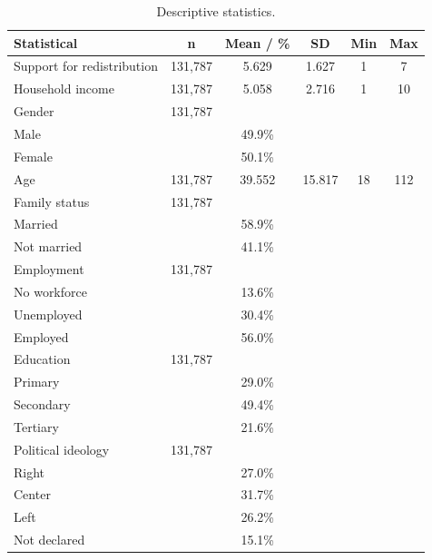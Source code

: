 \documentclass[utf8]{frontiersSCNS} %
\begin{document}
\begin{table}
\small\sf\centering
\caption{Descriptive statistics.}
\label{tab:descreptive}
\begin{tabular}{lccccc}
\toprule
Statistical & n & Mean / \% & SD & Min & Max \\
\midrule
Support for redistribution & 131,787 & 5.629 & 1.627 & 1 & 7 \\
Household income & 131,787 & 5.058 & 2.716 & 1 & 10 \\
Gender & 131,787 &  &  & &  \\
\hspace{3mm}Male & & 49.9\% & & & \\
\hspace{3mm}Female & & 50.1\% & & & \\
Age & 131,787 & 39.552 & 15.817 & 18 & 112 \\
Family status & 131,787 &  &  &  &  \\
\hspace{3mm}Married & & 58.9\% & & & \\
\hspace{3mm}Not married & & 41.1\% & & & \\
Employment & 131,787 &  &  &  &  \\
\hspace{3mm}No workforce & & 13.6\% & & & \\
\hspace{3mm}Unemployed & & 30.4\% & & & \\
\hspace{3mm}Employed & & 56.0\% & & & \\
Education & 131,787 &  &  &  &  \\
\hspace{3mm}Primary & & 29.0\% & & & \\
\hspace{3mm}Secondary & & 49.4\% & & & \\
\hspace{3mm}Tertiary & & 21.6\% & & & \\
Political ideology & 131,787 & & & & \\
\hspace{3mm}Right & & 27.0\% & & & \\
\hspace{3mm}Center & & 31.7\% & & & \\
\hspace{3mm}Left & & 26.2\% & & & \\
\hspace{3mm}Not declared & & 15.1\% & & & \\

\end{tabular}
\end{table}
\end{document}
